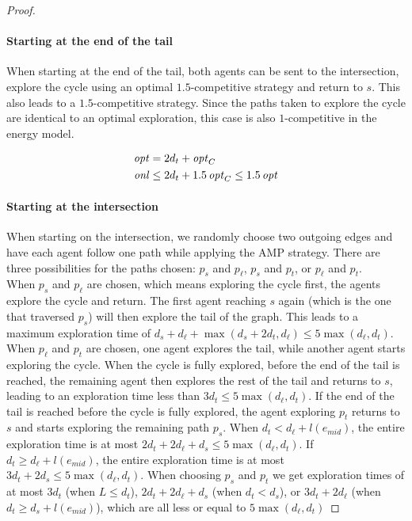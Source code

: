 \begin{proof}
\paragraph*{Starting at the end of the tail}

When starting at the end of the tail, both agents can be sent to the intersection, explore the cycle using an optimal $1.5$-competitive strategy
and return to $s$. This also leads to a $1.5$-competitive strategy. Since the paths taken to explore the cycle are identical to an optimal exploration,
this case is also $1$-competitive in the energy model.

\begin{align*}
    \mathop{\mathit{opt}}\nolimits &= 2d_t + \mathop{\mathit{opt}}\nolimits_C\\
    \mathop{\mathit{onl}}\nolimits &\leq 2d_t + 1.5\mathop{\mathit{opt}}\nolimits_C \leq 1.5\mathop{\mathit{opt}}\nolimits
\end{align*}

\paragraph*{Starting at the intersection}

When starting on the intersection, we randomly choose two outgoing edges and have each agent follow one path while applying the AMP strategy.
There are three possibilities for the paths chosen: $p_s$ and $p_\ell$, $p_s$ and $p_t$, or $p_\ell$ and $p_t$.\\
When $p_s$ and $p_\ell$ are chosen, which means exploring the cycle first, the agents explore the cycle and return. 
The first agent reaching $s$ again (which is the one that traversed $p_s$) will then explore the tail of the graph. 
This leads to a maximum exploration time of $d_s + d_\ell + \max(d_s+2d_t, d_\ell) \leq 5\max(d_\ell, d_t)$.\\

When $p_\ell$ and $p_t$ are chosen, one agent explores the tail, while another agent starts exploring the cycle. When the cycle is fully explored,
before the end of the tail is reached, the remaining agent then explores the rest of the tail and returns to $s$, leading to an exploration time less than
$3d_t \leq 5\max(d_\ell, d_t)$. If the end of the tail is reached before the cycle is fully explored, the agent exploring $p_t$ returns to $s$ and starts
exploring the remaining path $p_s$. When $d_t < d_\ell + l(e_{mid})$, the entire exploration time is at most $2d_t + 2d_\ell + d_s \leq 5\max(d_\ell, d_t)$.
If $d_t \geq d_\ell + l(e_{mid})$, the entire exploration time is at most $3d_t + 2d_s \leq 5\max(d_\ell, d_t)$. When choosing $p_s$ and $p_t$ we get 
exploration times of at most $3d_t$ (when $L \leq d_t$), $2d_t + 2d_\ell + d_s$ (when $d_t < d_s$), or $3d_t + 2d_\ell$ (when $d_t \geq d_s + l(e_{mid})$),
which are all less or equal to $5\max(d_\ell, d_t)$



\end{proof}
